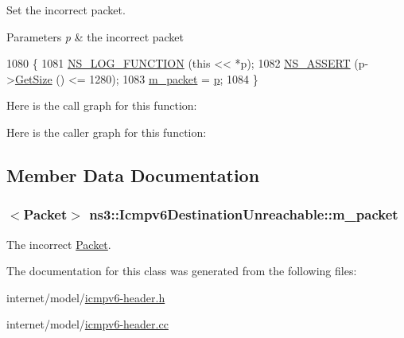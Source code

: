 Set the incorrect packet. 


\begin{DoxyParams}{Parameters}
{\em p} & the incorrect packet \\
\hline
\end{DoxyParams}

\begin{DoxyCode}
1080 \{
1081   \hyperlink{log-macros-disabled_8h_a90b90d5bad1f39cb1b64923ea94c0761}{NS\_LOG\_FUNCTION} (\textcolor{keyword}{this} << *p);
1082   \hyperlink{assert_8h_a6dccdb0de9b252f60088ce281c49d052}{NS\_ASSERT} (p->\hyperlink{classns3_1_1Packet_a462855c9929954d4301a4edfe55f4f1c}{GetSize} () <= 1280);
1083   \hyperlink{classns3_1_1Icmpv6DestinationUnreachable_a7d95d00df1bcc03ae819a9d9252e43ac}{m\_packet} = \hyperlink{lte__link__budget_8m_ac9de518908a968428863f829398a4e62}{p};
1084 \}
\end{DoxyCode}


Here is the call graph for this function\+:




Here is the caller graph for this function\+:




\subsection{Member Data Documentation}
\subsubsection[{\texorpdfstring{m\+\_\+packet}{m_packet}}]{$<${\bf Packet}$>$ ns3\+::\+Icmpv6\+Destination\+Unreachable\+::m\+\_\+packet\hspace{0.3cm}{\ttfamily [private]}}\hypertarget{classns3_1_1Icmpv6DestinationUnreachable_a7d95d00df1bcc03ae819a9d9252e43ac}{}\label{classns3_1_1Icmpv6DestinationUnreachable_a7d95d00df1bcc03ae819a9d9252e43ac}


The incorrect \hyperlink{classns3_1_1Packet}{Packet}. 



The documentation for this class was generated from the following files\+:\begin{DoxyCompactItemize}
\item 
internet/model/\hyperlink{icmpv6-header_8h}{icmpv6-\/header.\+h}\item 
internet/model/\hyperlink{icmpv6-header_8cc}{icmpv6-\/header.\+cc}\end{DoxyCompactItemize}
